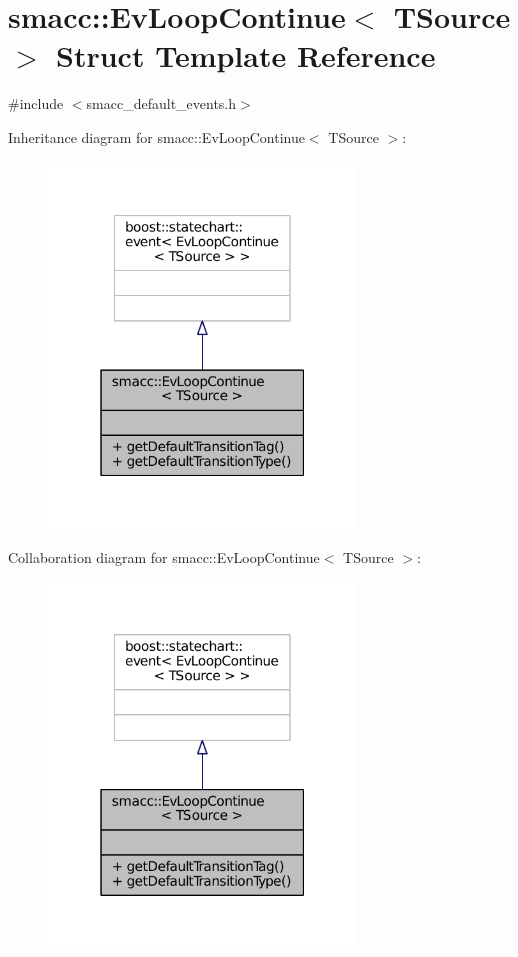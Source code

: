 \hypertarget{structsmacc_1_1EvLoopContinue}{}\section{smacc\+:\+:Ev\+Loop\+Continue$<$ T\+Source $>$ Struct Template Reference}
\label{structsmacc_1_1EvLoopContinue}


{\ttfamily \#include $<$smacc\+\_\+default\+\_\+events.\+h$>$}



Inheritance diagram for smacc\+:\+:Ev\+Loop\+Continue$<$ T\+Source $>$\+:
\nopagebreak
\begin{figure}[H]
\begin{center}
\leavevmode
\includegraphics[width=232pt]{structsmacc_1_1EvLoopContinue__inherit__graph}
\end{center}
\end{figure}


Collaboration diagram for smacc\+:\+:Ev\+Loop\+Continue$<$ T\+Source $>$\+:
\nopagebreak
\begin{figure}[H]
\begin{center}
\leavevmode
\includegraphics[width=232pt]{structsmacc_1_1EvLoopContinue__coll__graph}
\end{center}
\end{figure}
